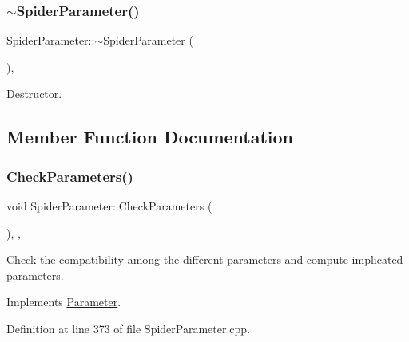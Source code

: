 \subsubsection{\texorpdfstring{$\sim$\+Spider\+Parameter()}{~SpiderParameter()}}
{\footnotesize\ttfamily Spider\+Parameter\+::$\sim$\+Spider\+Parameter (\begin{DoxyParamCaption}{ }\end{DoxyParamCaption})\hspace{0.3cm}{\ttfamily [override]}, {\ttfamily [default]}}



Destructor. 



\subsection{Member Function Documentation}
\mbox{\label{classSpiderParameter_a8e06c5f840c91a5207444d4f3fad6663}} 
\subsubsection{\texorpdfstring{Check\+Parameters()}{CheckParameters()}}
{\footnotesize\ttfamily void Spider\+Parameter\+::\+Check\+Parameters (\begin{DoxyParamCaption}{ }\end{DoxyParamCaption})\hspace{0.3cm}{\ttfamily [override]}, {\ttfamily [private]}, {\ttfamily [virtual]}}



Check the compatibility among the different parameters and compute implicated parameters. 



Implements \hyperlink{classParameter_a87315799c1a893687f796890f5d4f44d}{Parameter}.



Definition at line 373 of file Spider\+Parameter.\+cpp.



